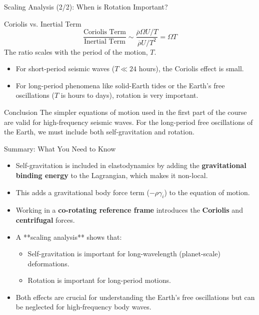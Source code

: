 \documentclass{beamer}
\begin{document}
\begin{frame}{Scaling Analysis (2/2): When is Rotation Important?}
    \begin{block}{Coriolis vs. Inertial Term}
        $$ \frac{\text{Coriolis Term}}{\text{Inertial Term}} \sim \frac{\overline{\rho}\Omega U / T}{\overline{\rho}U / T^{2}} = \Omega T $$
        The ratio scales with the period of the motion, $T$.
    \end{block}
    \pause
    \begin{itemize}
        \item For short-period seismic waves ($T \ll 24$ hours), the Coriolis effect is small.
        \pause
        \item For long-period phenomena like solid-Earth tides or the Earth's free oscillations ($T$ is hours to days), rotation is very important.
    \end{itemize}
    \pause
    \begin{alertblock}{Conclusion}
        The simpler equations of motion used in the first part of the course are valid for high-frequency seismic waves. For the long-period free oscillations of the Earth, we must include both self-gravitation and rotation.
    \end{alertblock}
\end{frame}


\begin{frame}{Summary: What You Need to Know}
    \begin{itemize}
        \item Self-gravitation is included in elastodynamics by adding the \textbf{gravitational binding energy} to the Lagrangian, which makes it non-local.
        \pause
        \item This adds a gravitational body force term ($ -\rho\gamma_i $) to the equation of motion.
        \pause
        \item Working in a \textbf{co-rotating reference frame} introduces the \textbf{Coriolis} and \textbf{centrifugal} forces.
        \pause
        \item A **scaling analysis** shows that:
        \begin{itemize}
            \item Self-gravitation is important for long-wavelength (planet-scale) deformations.
            \item Rotation is important for long-period motions.
        \end{itemize}
        \pause
        \item Both effects are crucial for understanding the Earth's free oscillations but can be neglected for high-frequency body waves.
    \end{itemize}
\end{frame}
\end{document}
